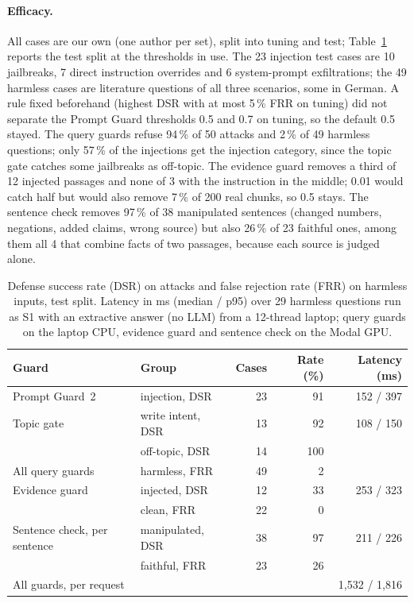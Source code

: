 \paragraph{Efficacy.}
All cases are our own (one author per set), split into tuning and test; Table~\ref{tab:guardrails} reports the test split at the thresholds in use.
The 23 injection test cases are 10 jailbreaks, 7 direct instruction overrides and 6 system-prompt exfiltrations; the 49 harmless cases are literature questions of all three scenarios, some in German.
A rule fixed beforehand (highest DSR with at most 5\,\% FRR on tuning) did not separate the Prompt Guard thresholds 0.5 and 0.7 on tuning, so the default 0.5 stayed.
The query guards refuse 94\,\% of 50 attacks and 2\,\% of 49 harmless questions; only 57\,\% of the injections get the injection category, since the topic gate catches some jailbreaks as off-topic.
The evidence guard removes a third of 12 injected passages and none of 3 with the instruction in the middle; 0.01 would catch half but would also remove 7\,\% of 200 real chunks, so 0.5 stays.
The sentence check removes 97\,\% of 38 manipulated sentences (changed numbers, negations, added claims, wrong source) but also 26\,\% of 23 faithful ones, among them all 4 that combine facts of two passages, because each source is judged alone.

\begin{table}[ht]
\centering
\caption{Defense success rate (DSR) on attacks and false rejection rate (FRR) on harmless inputs, test split. Latency in ms (median / p95) over 29 harmless questions run as S1 with an extractive answer (no LLM) from a 12-thread laptop; query guards on the laptop CPU, evidence guard and sentence check on the Modal GPU.}
\label{tab:guardrails}
\small
\begin{tabular}{llrrr}
\toprule
Guard & Group & Cases & Rate (\%) & Latency (ms) \\
\midrule
Prompt Guard~2 & injection, DSR & 23 & 91 & 152 / 397 \\
Topic gate & write intent, DSR & 13 & 92 & 108 / 150 \\
 & off-topic, DSR & 14 & 100 &  \\
All query guards & harmless, FRR & 49 & 2 &  \\
Evidence guard & injected, DSR & 12 & 33 & 253 / 323 \\
 & clean, FRR & 22 & 0 &  \\
Sentence check, per sentence & manipulated, DSR & 38 & 97 & 211 / 226 \\
 & faithful, FRR & 23 & 26 &  \\
\midrule
All guards, per request & & & & 1{,}532 / 1{,}816 \\
\bottomrule
\end{tabular}
\end{table}

